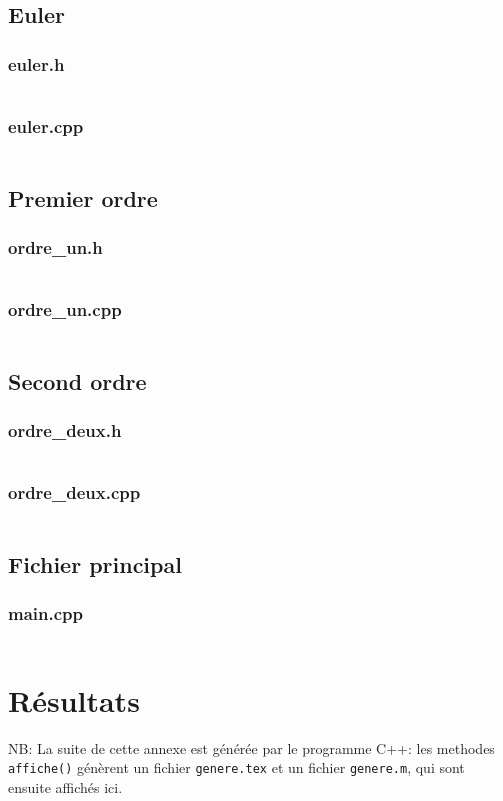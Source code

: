 \documentclass{report}
\begin{document}
\section{Euler}
\subsection{euler.h}
\inputminted[linenos,fontsize=\scriptsize]{c++}{../src/euler.h}
\subsection{euler.cpp}
\inputminted[linenos,fontsize=\scriptsize]{c++}{../src/euler.cpp}

\section{Premier ordre}
\subsection{ordre\_un.h}
\inputminted[linenos,fontsize=\scriptsize]{c++}{../src/source.h}
\subsection{ordre\_un.cpp}
\inputminted[linenos,fontsize=\scriptsize]{c++}{../src/source.cpp}

\section{Second ordre}
\subsection{ordre\_deux.h}
\inputminted[linenos,fontsize=\scriptsize]{c++}{../src/source.h}
\subsection{ordre\_deux.cpp}
\inputminted[linenos,fontsize=\scriptsize]{c++}{../src/source.cpp}

\section{Fichier principal}
\subsection{main.cpp}
\inputminted[linenos,fontsize=\scriptsize]{c++}{../src/main.cpp}


\chapter{Résultats}
NB: La suite de cette annexe est générée par le programme C++: les methodes \verb|affiche()| génèrent
un fichier \verb|genere.tex| et un fichier \verb|genere.m|, qui sont ensuite affichés ici.

\end{document}
